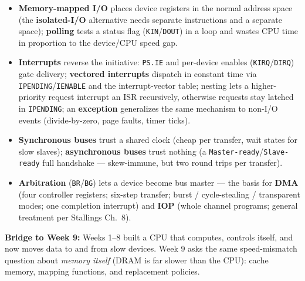 \documentclass[11pt]{article}
\begin{document}
\begin{itemize}
  \item \textbf{Memory-mapped I/O} places device registers in the normal address space (the \textbf{isolated-I/O} alternative needs separate instructions and a separate space); \textbf{polling} tests a status flag (\texttt{KIN}/\texttt{DOUT}) in a loop and wastes CPU time in proportion to the device/CPU speed gap.
  \item \textbf{Interrupts} reverse the initiative: \texttt{PS.IE} and per-device enables (\texttt{KIRQ}/\texttt{DIRQ}) gate delivery; \textbf{vectored interrupts} dispatch in constant time via \texttt{IPENDING}/\texttt{IENABLE} and the interrupt-vector table; nesting lets a higher-priority request interrupt an ISR recursively, otherwise requests stay latched in \texttt{IPENDING}; an \textbf{exception} generalizes the same mechanism to non-I/O events (divide-by-zero, page faults, timer ticks).
  \item \textbf{Synchronous buses} trust a shared clock (cheap per transfer, wait states for slow slaves); \textbf{asynchronous buses} trust nothing (a \texttt{Master-ready}/\texttt{Slave-ready} full handshake --- skew-immune, but two round trips per transfer).
  \item \textbf{Arbitration} (\texttt{BR}/\texttt{BG}) lets a device become bus master --- the basis for \textbf{DMA} (four controller registers; six-step transfer; burst / cycle-stealing / transparent modes; one completion interrupt) and \textbf{IOP} (whole channel programs; general treatment per Stallings Ch.~8).
\end{itemize}

\textbf{Bridge to Week 9:} Weeks 1--8 built a CPU that computes, controls itself, and now moves data to and from slow devices. Week 9 asks the same speed-mismatch question about \emph{memory itself} (DRAM is far slower than the CPU): cache memory, mapping functions, and replacement policies.
\end{document}
